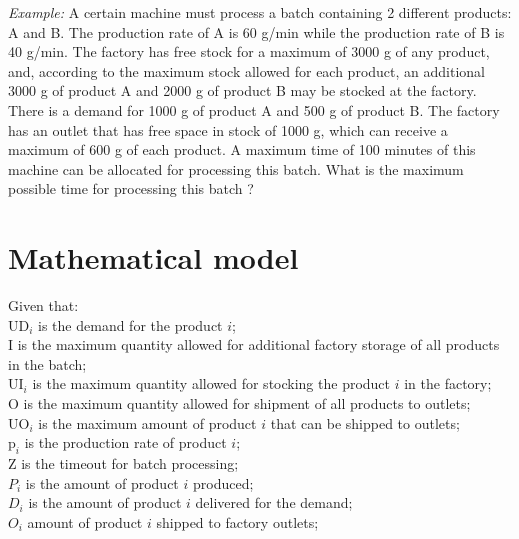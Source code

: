 \documentclass[preprint,12pt,authoryear]{elsarticle}
\begin{document}
\emph{Example:} A certain machine must process a batch containing 2 different products: A and B. The production rate of A is 60 g/min while the production rate of B is 40 g/min. The factory has free stock for a maximum of 3000 g of any product, and, according to the maximum stock allowed for each product, an additional 3000 g of product A and 2000 g of product B may be stocked at the factory. There is a demand for 1000 g of product A and 500 g of product B. The factory has an outlet that has free space in stock of 1000 g, which can receive a maximum of 600 g of each product. A maximum time of 100 minutes of this machine can be allocated for processing this batch. What is the maximum possible time for processing this batch ? 

\section{Mathematical model}
\label{}

Given that: \\

$\textrm{UD}_i$ is the demand for the product $i$; \\

$\textrm{I}$ is the maximum quantity allowed for additional factory storage of all products in the batch; \\

$\textrm{UI}_i$ is the maximum quantity allowed for stocking the product $i$ in the factory; \\

$\textrm{O}$ is the maximum quantity allowed for shipment of all products to outlets; \\

$\textrm{UO}_i$ is the maximum amount of product $i$ that can be shipped to outlets; \\ 

$\textrm{p}_i$ is the production rate of product $i$; \\

$\textrm{Z}$ is the timeout for batch processing; \\

$P_i$ is the amount of product $i$ produced; \\

$D_i$ is the amount of product $i$ delivered for the demand; \\

$O_i$ amount of product $i$ shipped to factory outlets; \\
\end{document}
